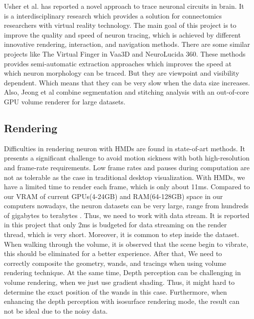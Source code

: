 \documentclass[10pt,twocolumn,letterpaper]{article}
\begin{document}
Usher et al.\cite{Usher2018} has reported a novel approach to trace neuronal circuits in brain. It is a interdisciplinary research which provides a solution for connectomics researchers with virtual reality technology. The main goal of this project is to improve the quality and speed of neuron tracing, which is achieved by different innovative rendering, interaction, and navigation methods. There are some similar projects like The Virtual Finger in Vaa3D and NeuroLucida 360. These methods provides semi-automatic extraction approaches which improves the speed at which neuron morphology can be traced. But they are viewpoint and visibility dependent. Which means that they can be very slow when the data size increases. Also, Jeong et al \cite{Jeong2010} combine segmentation and stitching analysis with an out-of-core GPU volume renderer for large datasets.
\subsection{Rendering}
Difficulties in rendering neuron with HMDs are found in state-of-art methods. It presents a significant challenge to avoid motion sickness with both high-resolution and frame-rate requirements. Low frame rates and pauses during computation are not as tolerable as the case in traditional desktop visualization. With HMDs, we have a limited time to render each frame, which is only about 11ms. Compared to our VRAM of current GPUs(4-24GB) and RAM(64-128GB) space in our computers nowadays, the neuron datasets can be very large, range from hundreds of gigabytes to terabytes \cite{Usher2018}. Thus, we need to work with data stream. It is reported in this project that only 2ms is budgeted for data streaming on the render thread, which is very short. Moreover, it is common to step inside the dataset. When walking through the volume, it is observed that the scene begin to vibrate, this should be eliminated for a better experience. After that, We need to correctly composite the geometry, wands, and tracings when using volume rendering technique. At the same time, Depth perception can be challenging in volume rendering, when we just use gradient shading. Thus, it might hard to determine the exact position of the wands in this case. Furthermore, when enhancing the depth perception with isosurface rendering mode, the result can not be ideal due to the noisy data.
\end{document}
